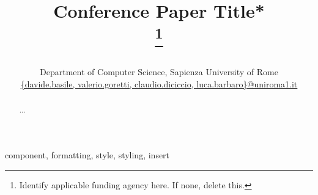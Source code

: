 \documentclass[conference]{IEEEtran}
\newcommand{\hyperurl}[2]{\href{#1}{\url{#2}}}
\begin{document}
\title{Conference Paper Title*\\
\thanks{Identify applicable funding agency here. If none, delete this.}
}

\author{\\
Department of Computer Science, Sapienza University of Rome \\
\hyperurl{mailto:davide.basile@uniroma1.it;valerio.goretti@uniroma1.it;claudio.diciccio@uniroma1.it;luca.barbaro@uniroma1.it}{{davide.basile, valerio.goretti, claudio.diciccio, luca.barbaro}@uniroma1.it}}



\maketitle

\begin{abstract}
...
\end{abstract}

\begin{IEEEkeywords}
component, formatting, style, styling, insert
\end{IEEEkeywords}










\end{document}
